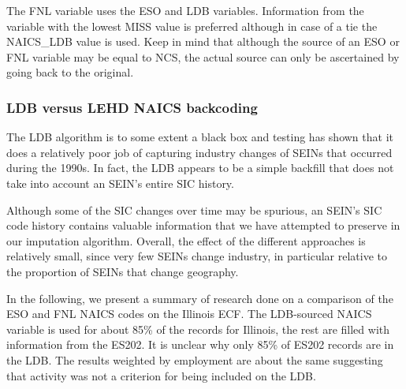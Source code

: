 The FNL variable uses the ESO and LDB variables. Information from the 
variable with the lowest MISS value is preferred although in case of a tie 
the NAICS{\_}LDB value is used. Keep in mind that although the source of an 
ESO or FNL variable may be equal to NCS, the actual source can only be 
ascertained by going back to the original.



\subsubsection{LDB versus LEHD NAICS backcoding}
\label{sec:backcoding}

The LDB algorithm is to some extent a black box and testing has shown that 
it does a relatively poor job of capturing  industry changes of SEINs that 
occurred during the 1990s. In fact, the LDB appears to be a simple
backfill that does not take into account an SEIN's entire SIC history.

% 

Although some of the SIC changes over time may be spurious, an SEIN's SIC
code history contains valuable information that we have attempted to
preserve in our imputation algorithm. Overall, the effect of the different
approaches is relatively small, since very few SEINs change industry, in
particular relative to the proportion of SEINs that change geography.


In the following, we present  a summary of research done on a comparison of
the ESO and FNL NAICS codes on the Illinois ECF. 
%
%
The LDB-sourced NAICS variable is used for about 85{\%} of the records for
Illinois, the rest are filled with information from the ES202. It is
unclear why only 85{\%} of ES202 records are in the LDB. The results
weighted by employment are about the same suggesting that activity was not
a criterion for being included on the LDB. 

